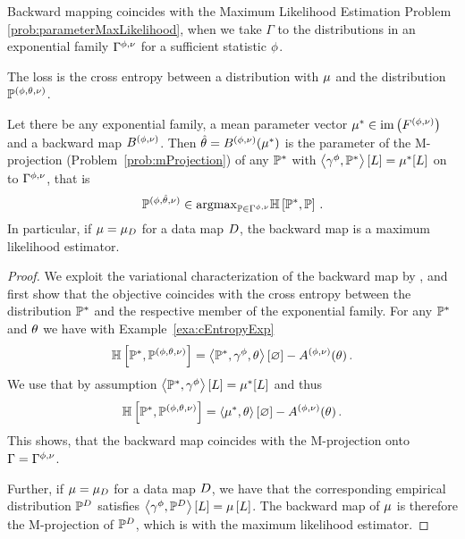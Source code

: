 Backward mapping coincides with the Maximum Likelihood Estimation Problem \eqref{prob:parameterMaxLikelihood}, when we take $\Gamma$ to the distributions in an exponential family $\Gamma^{\phi,\nu}$ for a sufficient statistic $\phi$.

The loss is the cross entropy between a distribution with $\mu$ and the distribution $\mathbb{P}^{(\phi,\theta,\nu)}$.


\begin{theorem}
	Let there be any exponential family, a mean parameter vector $\mu^*\in\mathrm{im}\left(F^{(\phi,\nu)}\right)$ and a backward map $B^{(\phi,\nu)}$.
	Then $\hat{\theta}=B^{(\phi,\nu)}(\mu^*)$ is the parameter of the M-projection (Problem~\ref{prob:mProjection}) of any $\mathbb{P}^*$ with $\left\langle \gamma^{\phi},\mathbb{P}^*\right\rangle \left[ L \right]=\mu^*[L]$ on to $\Gamma^{\phi,\nu}$, that is
		\[ \mathbb{P}^{(\phi,\hat{\theta},\nu)} \in \mathrm{argmax}_{\mathbb{P}\in\Gamma^{\phi,\nu}} \mathbb{H}\left[\mathbb{P}^*,\mathbb{P}\right]  \, . \]
	In particular, if $\mu=\mu_{D}$ for a data map $D$, the backward map is a maximum likelihood estimator.
\end{theorem}
\begin{proof}
	We exploit the variational characterization of the backward map by , and first show that the objective coincides with the cross entropy between the distribution $\mathbb{P}^*$ and the respective member of the exponential family.
	For any $\mathbb{P}^*$ and $\theta$ we have with Example~\ref{exa:cEntropyExp}
	\begin{align*}
		\mathbb{H}\left[\mathbb{P}^*,\mathbb{P}^{(\phi,\theta,\nu)}\right] 
		=   \left\langle \mathbb{P}^*,\gamma^{\phi},\theta\right\rangle \left[ \varnothing \right] -A^{(\phi,\nu)}(\theta) \, .  
	\end{align*}
	We use that by assumption $\left\langle \mathbb{P}^*,\gamma^{\phi}\right\rangle \left[ L \right]=\mu^*[L]$ and thus
	\begin{align*}
		\mathbb{H}\left[\mathbb{P}^*,\mathbb{P}^{(\phi,\theta,\nu)}\right] 
		=   \left\langle \mu^*,\theta\right\rangle \left[ \varnothing \right] -A^{(\phi,\nu)}(\theta) \, .  
	\end{align*}
	This shows, that the backward map coincides with the M-projection onto $\Gamma=\Gamma^{\phi,\nu}$.

	Further, if $\mu=\mu_{D}$ for a data map $D$, we have that the corresponding empirical distribution $\mathbb{P}^{D}$ satisfies $\left\langle \gamma^{\phi},\mathbb{P}^{D}\right\rangle \left[ L \right]=\mu\left[L\right]$.
	The backward map of $\mu$ is therefore the M-projection of $\mathbb{P}^{D}$, which is with  the maximum likelihood estimator.
\end{proof}


